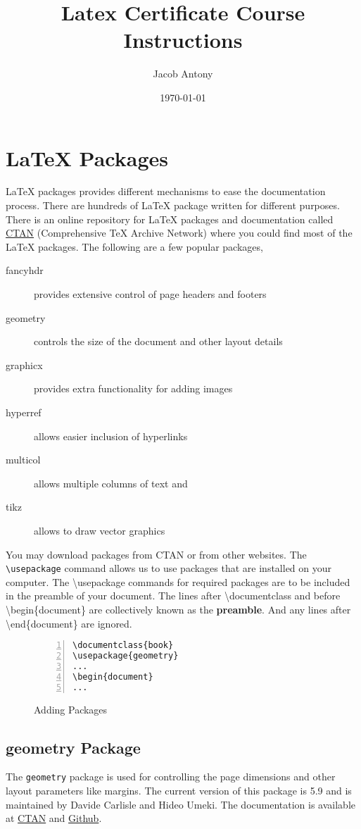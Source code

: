 \documentclass{article}
\title{Latex Certificate Course Instructions}
\author{Jacob Antony}
\date{\today}
\begin{document}
\maketitle

\section{\LaTeX{} Packages}
\LaTeX{} packages provides different mechanisms to ease the documentation process. There are hundreds of \LaTeX{} package written for different purposes. There is an online repository for \LaTeX{} packages and documentation called \href{https://ctan.org/pkg}{CTAN} (Comprehensive TeX Archive Network) where you could find most of the \LaTeX{} packages. The following are a few popular packages,
\begin{description}
	\item[fancyhdr] provides extensive control of page headers and footers
	\item[geometry] controls the size of the document and other layout details
	\item[graphicx] provides extra functionality for adding images
	\item[hyperref] allows easier inclusion of hyperlinks
	\item[multicol] allows multiple columns of text and
	\item[tikz] allows to draw vector graphics
\end{description}

You may download packages from CTAN or from other websites. The \texttt{\textbackslash usepackage} command allows us to use packages that are installed on your computer. The \textbackslash usepackage commands for required packages are to be included in the preamble of your document. The lines after \textbackslash documentclass and before \textbackslash begin\{document\} are collectively known as the \textbf{preamble}. And any lines after \textbackslash end\{document\} are ignored.

\begin{figure}[h]
\centering
\begin{Verbatim}[numbers = left]
\documentclass{book}
\usepackage{geometry}
...
\begin{document}
...
\end{Verbatim}
\caption{Adding Packages}
\end{figure}

\subsection{geometry Package}
	The \texttt{geometry} package is used for controlling the page dimensions and other layout parameters like margins. The current version of this package is 5.9 and is maintained by Davide Carlisle and Hideo Umeki. The documentation is available at \href{https://ctan.org/pkg/geometry}{CTAN} and \href{https://github.com/davidcarlisle/geometry}{Github}.
\end{document}
